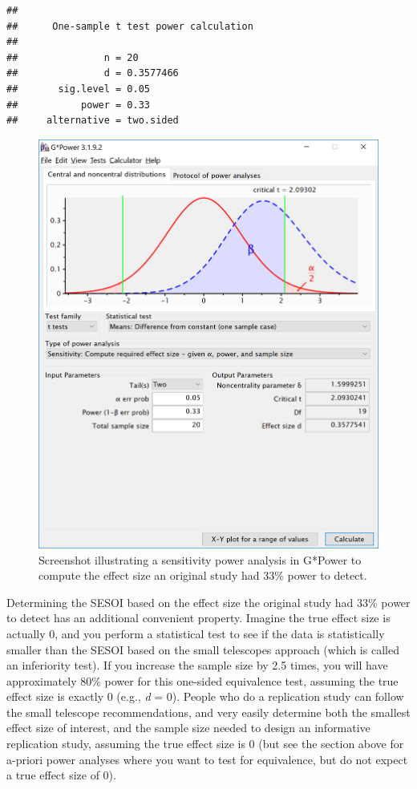 \documentclass[
  oneside]{krantz}
\begin{document}
\begin{verbatim}
## 
##      One-sample t test power calculation 
## 
##               n = 20
##               d = 0.3577466
##       sig.level = 0.05
##           power = 0.33
##     alternative = two.sided
\end{verbatim}



\begin{figure}

{\centering \includegraphics[width=1\linewidth]{images/0deabffd850f7b63c16e41e0af9ae0b6} 

}

\caption{Screenshot illustrating a sensitivity power analysis in G*Power to compute the effect size an original study had 33\% power to detect.}\label{fig:smalltelpower}
\end{figure}

Determining the SESOI based on the effect size the original study had 33\% power to detect has an additional convenient property. Imagine the true effect size is actually 0, and you perform a statistical test to see if the data is statistically smaller than the SESOI based on the small telescopes approach (which is called an inferiority test). If you increase the sample size by 2.5 times, you will have approximately 80\% power for this one-sided equivalence test, assuming the true effect size is exactly 0 (e.g., \emph{d} = 0). People who do a replication study can follow the small telescope recommendations, and very easily determine both the smallest effect size of interest, and the sample size needed to design an informative replication study, assuming the true effect size is 0 (but see the section above for a-priori power analyses where you want to test for equivalence, but do not expect a true effect size of 0).
\end{document}
